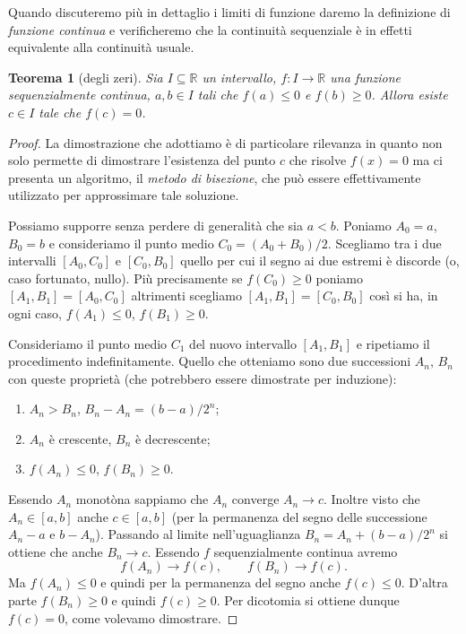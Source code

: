 \documentclass[italian,a4paper,oneside,headinclude]{scrbook}
\newcommand{\myemph}[1]{\emph{#1}\marginpar{#1}}
\renewcommand{\subset}{\subseteq}
\newcommand{\RR}{\mathbb R}
\newtheorem{theorem}{Teorema}
\begin{document}
Quando discuteremo più in dettaglio i limiti di funzione
daremo la definizione di \emph{funzione continua} e verificheremo
che la continuità sequenziale è in effetti equivalente alla continuità
usuale.


\begin{theorem}[degli zeri]
Sia $I\subset \RR$ un intervallo, $f\colon I \to \RR$ una funzione
sequenzialmente continua, $a,b\in I$ tali che $f(a)\le 0$ e $f(b)\ge 0$.
Allora esiste $c\in I$ tale che $f(c)=0$.
\end{theorem}

\begin{proof}
La dimostrazione che adottiamo è di particolare rilevanza in quanto
non solo permette di dimostrare l'esistenza del punto $c$ che risolve
$f(x)=0$
ma ci presenta
un algoritmo, il \myemph{metodo di bisezione},
che può essere effettivamente utilizzato per approssimare
tale soluzione.

Possiamo supporre senza perdere di  generalità che sia $a<b$.
Poniamo $A_0 = a$, $B_0= b$ e consideriamo il punto medio $C_0 = (A_0+B_0)/2$.
Scegliamo tra i due intervalli $[A_0, C_0]$ e $[C_0,B_0]$ quello per cui
il segno ai due estremi è discorde (o, caso fortunato, nullo).
Più precisamente se $f(C_0)\ge 0$ poniamo $[A_1,B_1] = [A_0,C_0]$ altrimenti
scegliamo $[A_1,B_1] = [C_0,B_0]$ così si ha, in ogni caso,
$f(A_1)\le 0$, $f(B_1)\ge 0$.

Consideriamo il punto medio $C_1$ del nuovo intervallo $[A_1,B_1]$ e ripetiamo
il procedimento indefinitamente. Quello che otteniamo sono due successioni
$A_n$, $B_n$ con queste proprietà (che potrebbero essere dimostrate per induzione):
\begin{enumerate}
\item $A_n > B_n$, $B_n - A_n = (b-a)/2^n$;
\item $A_n$ è crescente, $B_n$ è decrescente;
\item $f(A_n)\le 0$, $f(B_n)\ge 0$.
\end{enumerate}

Essendo $A_n$ monotòna sappiamo che $A_n$ converge $A_n\to c$.
Inoltre visto che $A_n \in [a,b]$ anche $c\in [a,b]$ (per la permanenza del
segno delle successione $A_n-a$ e $b-A_n$).
Passando al limite nell'uguaglianza $B_n = A_n + (b-a)/2^n$
si ottiene che anche $B_n \to c$. Essendo $f$ sequenzialmente continua
avremo
\[
f(A_n) \to f(c), \qquad
f(B_n) \to f(c).
\]
Ma $f(A_n)\le 0$ e quindi per la permanenza del segno anche $f(c)\le 0$.
D'altra parte $f(B_n) \ge 0$ e quindi $f(c)\ge 0$. Per dicotomia si
ottiene dunque $f(c) = 0$, come volevamo dimostrare.
\end{proof}
\end{document}
